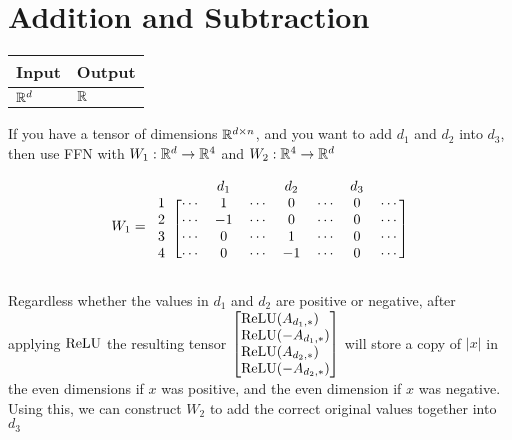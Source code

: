 \section{Addition and Subtraction}


    \begin{tabular}{|p{1.5cm}|p{1.5cm}|}
        \hline
        \rowcolor{orange!20} %
        \textbf{Input} & \textbf{Output} \\
        \hline
        $\mathbb{R}^d$ & $\mathbb{R}$ \\
        \hline
    \end{tabular}

If you have a tensor of dimensions $\mathbb{R}^{d\times n}$, and you want to add 
$d_1$ and $d_2$ into $d_3$, then use FFN with $W_1:\mathbb{R}^d\to \mathbb{R}^4$ and $W_2:\mathbb{R}^4\to \mathbb{R}^d$

    \begin{equation*}
        W_1=
        \begin{blockarray}{cccccccc}
            & & d_1 & & d_2 & & d_3 & \\
            \begin{block}{c[ccccccc]}
                    1& \cdots & 1 & \cdots & 0 & \cdots & 0 & \cdots \\
                    2& \cdots & -1 & \cdots & 0 & \cdots & 0 & \cdots \\
                    3& \cdots & 0 & \cdots & 1 & \cdots & 0 & \cdots \\
                    4& \cdots & 0 & \cdots & -1 & \cdots & 0 & \cdots \\
            \end{block}
        \end{blockarray}
    \end{equation*}

    Regardless whether the values in $d_1$ and $d_2$ are positive or negative, after applying $\text{ReLU}$ the resulting tensor $\begin{bmatrix}
        \ReLU(A_{d_1,*})\phantom- \\
        \ReLU(-A_{d_1,*})\\
        \ReLU(A_{d_2,*})\phantom- \\
        \ReLU(-A_{d_2,*})\\
    \end{bmatrix}$ will store a copy of $|x|$ in the even dimensions if $x$ was positive, and the even dimension if $x$ was negative. Using this, we can construct $W_2$ to add the correct original values together into $d_3$
    

